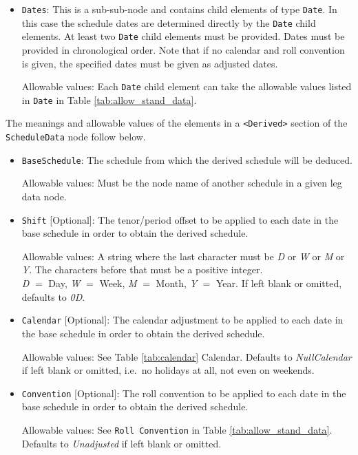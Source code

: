\begin{itemize}
\item \lstinline!Dates!: This is a sub-sub-node and contains child elements of type
  \lstinline!Date!. In this case the schedule dates are determined
  directly by the \lstinline!Date! child elements.  At least two
  \lstinline!Date! child elements must be provided. Dates must be provided in chronological order. Note that if no calendar and roll convention is given, the specified dates must be given as adjusted dates.    

  Allowable values: Each \lstinline!Date!  child element can take the allowable values listed in \lstinline!Date! in
  Table \ref{tab:allow_stand_data}.

\end{itemize}

\medskip
The meanings and allowable values of the elements in a {\tt <Derived>} section of the \lstinline!ScheduleData! node follow below.

\begin{itemize}

\item \lstinline!BaseSchedule!: The schedule from which the derived schedule will be deduced.

Allowable values: Must be the node name of another schedule in a given leg data node.

\item \lstinline!Shift! [Optional]: The tenor/period offset to be applied to each date in the base schedule in order to obtain the derived schedule.

Allowable values: A string where the last character must be \emph{D} or \emph{W} or
\emph{M} or \emph{Y}.  The characters before that must be a positive integer. \\ \emph{D}
$=$ Day, \emph{W} $=$ Week, \emph{M} $=$ Month, \emph{Y} $=$ Year. If left blank or omitted, defaults to \emph{0D}.

\item \lstinline!Calendar! [Optional]: The calendar adjustment to be applied to each date in the base schedule in order to obtain the derived schedule.

Allowable values: See Table \ref{tab:calendar} Calendar. Defaults to \emph{NullCalendar} if left blank or omitted, i.e.\ no holidays at all, not even on weekends.

\item \lstinline!Convention! [Optional]: The roll convention to be applied to each date in the base schedule in order to obtain the derived schedule.

Allowable values: See \lstinline!Roll Convention! in Table \ref{tab:allow_stand_data}. Defaults to \emph{Unadjusted} if left blank or omitted.

\end{itemize}